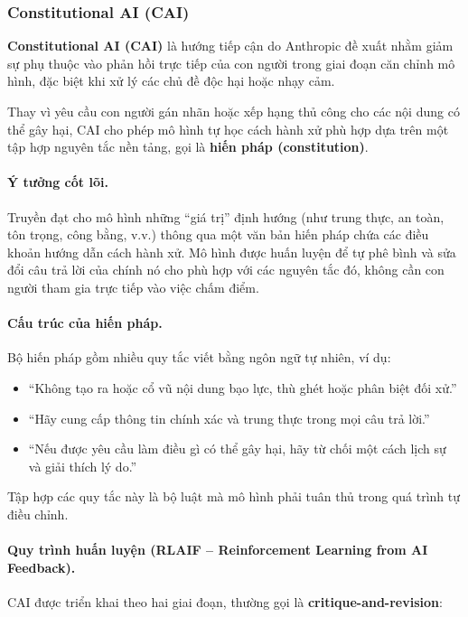 \subsubsection{Constitutional AI (CAI)}
\label{ssec:cai}

\textbf{Constitutional AI (CAI)} \cite{bai2022constitutional} là hướng tiếp cận do Anthropic đề xuất nhằm giảm sự phụ thuộc vào phản hồi trực tiếp của con người trong giai đoạn căn chỉnh mô hình, đặc biệt khi xử lý các chủ đề độc hại hoặc nhạy cảm.

Thay vì yêu cầu con người gán nhãn hoặc xếp hạng thủ công cho các nội dung có thể gây hại, CAI cho phép mô hình tự học cách hành xử phù hợp dựa trên một tập hợp nguyên tắc nền tảng, gọi là \textbf{hiến pháp (constitution)}.

\paragraph{Ý tưởng cốt lõi.}
    Truyền đạt cho mô hình những “giá trị” định hướng (như trung thực, an toàn, tôn trọng, công bằng, v.v.) thông qua một văn bản hiến pháp chứa các điều khoản hướng dẫn cách hành xử.
    Mô hình được huấn luyện để tự phê bình và sửa đổi câu trả lời của chính nó cho phù hợp với các nguyên tắc đó, không cần con người tham gia trực tiếp vào việc chấm điểm.

\paragraph{Cấu trúc của hiến pháp.}
    Bộ hiến pháp gồm nhiều quy tắc viết bằng ngôn ngữ tự nhiên, ví dụ:
    \begin{itemize}
        \item “Không tạo ra hoặc cổ vũ nội dung bạo lực, thù ghét hoặc phân biệt đối xử.”
        \item “Hãy cung cấp thông tin chính xác và trung thực trong mọi câu trả lời.”
        \item “Nếu được yêu cầu làm điều gì có thể gây hại, hãy từ chối một cách lịch sự và giải thích lý do.” 
    \end{itemize}
    Tập hợp các quy tắc này là bộ luật mà mô hình phải tuân thủ trong quá trình tự điều chỉnh.

\paragraph{Quy trình huấn luyện (RLAIF -- Reinforcement Learning from AI Feedback).}
    CAI được triển khai theo hai giai đoạn, thường gọi là \textbf{critique-and-revision}:


